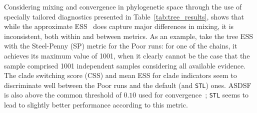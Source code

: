 Considering mixing and convergence in phylogenetic space through the use of specially tailored diagnostics presented in Table~\ref{tab:tree_results}, shows that while the approximate ESS~\citep{Lanfear2016} does capture major differences in mixing, it is inconsistent, both within and between metrics.
As an example, take the tree ESS with the Steel-Penny (SP) metric for the Poor runs: for one of the chains, it achieves its maximum value of 1001, when it clearly cannot be the case that the sample comprised 1001 independent samples considering all available evidence.
The clade switching score (CSS) and mean ESS for clade indicators seem to discriminate well between the Poor runs and the default (and \verb|STL|) ones.
ASDSF is also above the common threshold of $0.10$ used for convergence~\citep{Ronquist2012}; \verb|STL| seems to lead to slightly better performance according to this metric.
